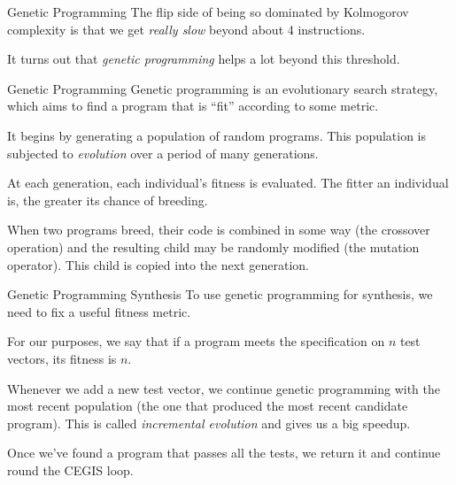 \documentclass[xcolor=pdftex,t,11pt]{beamer}
\begin{document}
\begin{frame}{Genetic Programming}
The flip side of being so dominated by Kolmogorov complexity is that we
get \emph{really slow} beyond about 4 instructions.

\vspace{1em}

It turns out that \emph{genetic programming} helps a lot beyond this threshold.
\end{frame}

\begin{frame}{Genetic Programming}
Genetic programming is an evolutionary search strategy, which aims to find a program
that is ``fit'' according to some metric.

\vspace{1em}

It begins by generating a population of random programs.  This population is subjected to
\emph{evolution} over a period of many generations.

\vspace{1em}

At each generation, each individual's fitness is evaluated.  The fitter an individual is,
the greater its chance of breeding.

When two programs breed, their code is combined in some way (the crossover operation) and
the resulting child may be randomly modified (the mutation operator).  This child is copied
into the next generation.
\end{frame}

\begin{frame}{Genetic Programming Synthesis}
To use genetic programming for synthesis, we need to fix a useful fitness metric.

\vspace{1em}

For our purposes, we say that if a program meets the specification on $n$ test vectors, its
fitness is $n$.

Whenever we add a new test vector, we continue genetic programming with the most recent population
(the one that produced the most recent candidate program).  This is called \emph{incremental evolution}
and gives us a big speedup.

\vspace{1em}

Once we've found a program that passes all the tests, we return it and continue round the CEGIS
loop.
\end{frame}
\end{document}
